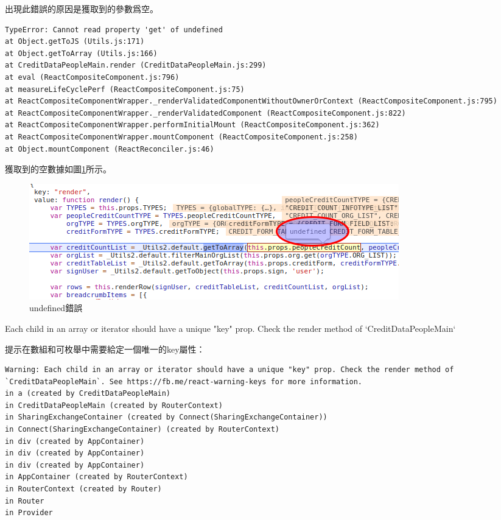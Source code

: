 \documentclass[11pt,fleqn]{book}
\makeatletter
\numberwithin{dummy}{section}
\theoremstyle{ocrenumbox}
\theoremstyle{blacknumex}
\theoremstyle{blacknumbox}
\theoremstyle{ocrenum}
\renewcommand\paragraph{\@startsection{paragraph}{4}{\z@}
	{-2ex \@plus-.2ex \@minus .2ex}
	{.1ex}
	{\normalfont\small\sffamily\bfseries}}
\makeatother
\begin{document}
出現此錯誤的原因是獲取到的參數爲空。

\begin{lstlisting}
TypeError: Cannot read property 'get' of undefined
at Object.getToJS (Utils.js:171)
at Object.getToArray (Utils.js:166)
at CreditDataPeopleMain.render (CreditDataPeopleMain.js:299)
at eval (ReactCompositeComponent.js:796)
at measureLifeCyclePerf (ReactCompositeComponent.js:75)
at ReactCompositeComponentWrapper._renderValidatedComponentWithoutOwnerOrContext (ReactCompositeComponent.js:795)
at ReactCompositeComponentWrapper._renderValidatedComponent (ReactCompositeComponent.js:822)
at ReactCompositeComponentWrapper.performInitialMount (ReactCompositeComponent.js:362)
at ReactCompositeComponentWrapper.mountComponent (ReactCompositeComponent.js:258)
at Object.mountComponent (ReactReconciler.js:46)
\end{lstlisting}

獲取到的空數據如圖\ref{fig:getundefineerror}所示。

\begin{figure}[htbp]
	\centering
	\includegraphics[scale=0.5]{getundefineerror.png}
	\caption{undefined錯誤}
	\label{fig:getundefineerror}
\end{figure}

\paragraph{Each child in an array or iterator should have a unique "key" prop. Check the render method of `CreditDataPeopleMain`}

提示在數組和可枚舉中需要給定一個唯一的key屬性：

\begin{lstlisting}
Warning: Each child in an array or iterator should have a unique "key" prop. Check the render method of `CreditDataPeopleMain`. See https://fb.me/react-warning-keys for more information.
in a (created by CreditDataPeopleMain)
in CreditDataPeopleMain (created by RouterContext)
in SharingExchangeContainer (created by Connect(SharingExchangeContainer))
in Connect(SharingExchangeContainer) (created by RouterContext)
in div (created by AppContainer)
in div (created by AppContainer)
in div (created by AppContainer)
in AppContainer (created by RouterContext)
in RouterContext (created by Router)
in Router
in Provider
\end{lstlisting}
\end{document}
